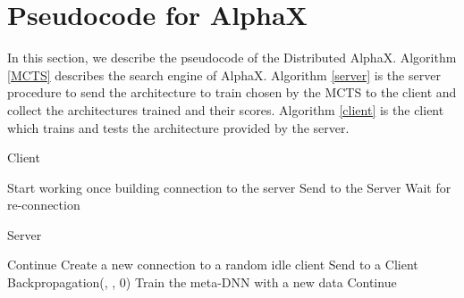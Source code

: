 \documentclass[10pt,twocolumn,letterpaper]{article}
\begin{document}
{\small


}



\newpage



\section{Pseudocode for AlphaX}
\label{ap:pseudocode}



In this section, we describe the pseudocode of the Distributed AlphaX. Algorithm \ref{MCTS} describes the search engine of AlphaX.
Algorithm \ref{server} is the server procedure to send the architecture to train chosen by the MCTS to the client and collect the architectures trained and their scores. Algorithm \ref{client} is the client which trains and tests the architecture provided by the server.


\begin{algorithm}[H]
  \caption{Client}
  \label{client}
    \begin{algorithmic}[1]
       Start working once building connection to the server
       \STATE 
       \STATE 
       \STATE Send  to the Server
      \ELSE
      \STATE Wait for re-connection
      \ENDIF
      \ENDWHILE
    \end{algorithmic}
\end{algorithm}

\begin{algorithm}[H]
  \caption{Server}
  \label{server}
    \begin{algorithmic}[1]


      \WHILE{}
      \STATE Continue 
      \ENDWHILE
      \STATE Create a new connection to a random idle client
      \STATE 
      \STATE Send  to a Client
      \IF{}
\STATE 
      \STATE 
\STATE 
      \STATE Backpropagation(, , 0) 
      \STATE Train the meta-DNN with a new data 
      \ELSE 
      \STATE Continue 
      \ENDIF
      \ENDWHILE
    \end{algorithmic}
\end{algorithm}

\newpage
\end{document}
